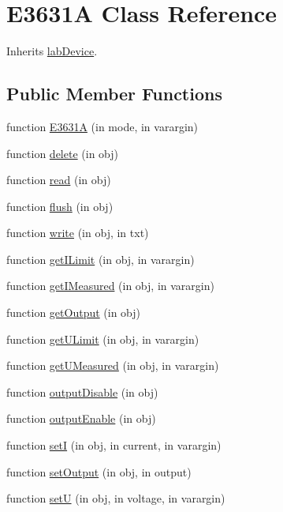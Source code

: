 \hypertarget{class_e3631_a}{}\section{E3631A Class Reference}
\label{class_e3631_a}


Inherits \hyperlink{classlab_device}{lab\+Device}.

\subsection*{Public Member Functions}
\begin{DoxyCompactItemize}
\item 
function \hyperlink{class_e3631_a_a1a783dbbf6a3daf9565a4a50edf20826}{E3631A} (in mode, in varargin)
\item 
function \hyperlink{class_e3631_a_aaf82ff5dbf7ecf8170f57563e9844901}{delete} (in obj)
\item 
function \hyperlink{class_e3631_a_ab3414a9eaa8cd7c0dc6985a9e25fd492}{read} (in obj)
\item 
function \hyperlink{class_e3631_a_a8fc8a942a60d0fbffb8baa25f0c342a6}{flush} (in obj)
\item 
function \hyperlink{class_e3631_a_a81d5ac55959b95d9a01a96245f9ad857}{write} (in obj, in txt)
\item 
function \hyperlink{class_e3631_a_a3597f612898976a0a84f1209f2a8ebb4}{get\+I\+Limit} (in obj, in varargin)
\item 
function \hyperlink{class_e3631_a_ac629521824c4009d6296492cfa32900a}{get\+I\+Measured} (in obj, in varargin)
\item 
function \hyperlink{class_e3631_a_a24dd1e1b7c742260af3d1f2c4154f282}{get\+Output} (in obj)
\item 
function \hyperlink{class_e3631_a_a3ed08f0eea7fa58f06697fe9bed328ca}{get\+U\+Limit} (in obj, in varargin)
\item 
function \hyperlink{class_e3631_a_a03e0603bcb55ea7bafb9872dfb2394d5}{get\+U\+Measured} (in obj, in varargin)
\item 
function \hyperlink{class_e3631_a_a8f98fab6cb0427d18133b91e7532c136}{output\+Disable} (in obj)
\item 
function \hyperlink{class_e3631_a_afaa98ccc1d622d7044c3cca0b0f763f4}{output\+Enable} (in obj)
\item 
function \hyperlink{class_e3631_a_a96bbb7a51e2e6431c1f5546327a927e6}{setI} (in obj, in current, in varargin)
\item 
function \hyperlink{class_e3631_a_a667afca413c54b9b063c39919dcea104}{set\+Output} (in obj, in output)
\item 
function \hyperlink{class_e3631_a_ad3656d04c20d33c190efc5ebaf575635}{setU} (in obj, in voltage, in varargin)
\end{DoxyCompactItemize}

